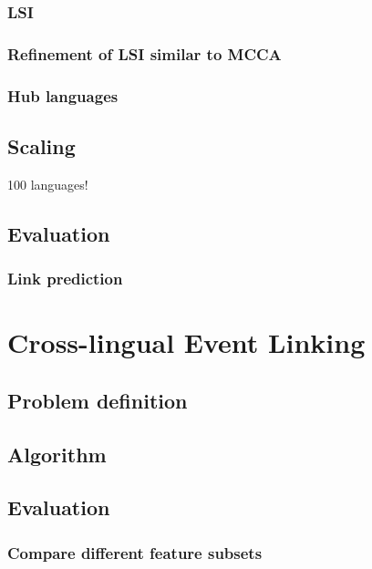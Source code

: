 \documentclass[twoside,11pt]{article}
\begin{document}
\subsubsection{LSI}

\subsubsection{Refinement of LSI similar to MCCA}

\subsubsection{Hub languages}
			
\subsection{Scaling}

100 languages!

\subsection{Evaluation}
 
\subsubsection{Link prediction}


\section{Cross-lingual Event Linking}

\subsection{Problem definition}

\subsection{Algorithm}

\subsection{Evaluation}

\subsubsection{Compare different feature subsets}
\end{document}
